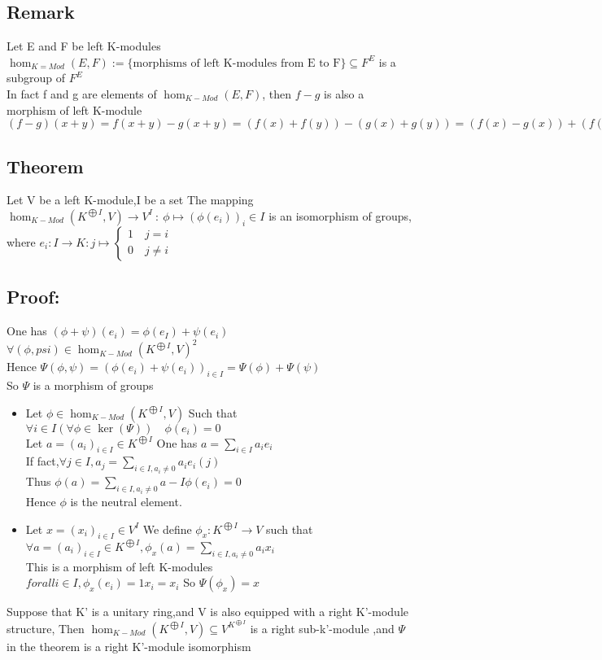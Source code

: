 \documentclass{book}
\begin{document}
\subsection{Remark}

Let E and F be left K-modules\\$\hom_{K=Mod}(E,F):=\{\text{morphisms of left K-modules from E to F}\}\subseteq F^E$ is a subgroup of $F^E$\\
In fact f and g are elements of $\hom_{K-Mod}(E,F)$, then $f-g$ is also a morphism of left K-module\\$(f-g)(x+y)=f(x+y)-g(x+y)=(f(x)+f(y))-(g(x)+g(y))=(f(x)-g(x))+(f(y)-g(y))=(f-g)(x)+(f-y)(x)$
\subsection{Theorem}

Let V be a left K-module,I be a set The mapping $\hom_{K-Mod}(K^{\bigoplus I},V)\rightarrow V^I\ :\ \phi\mapsto(\phi(e_i))_i\in I$ is an isomorphism of groups, where $e_i:I\rightarrow K:j\mapsto\left\{\begin{aligned}
    1\quad j=i\\
    0\quad j\not=i
\end{aligned} \right.$
\subsection{Proof:}
One has $(\phi+\psi)(e_i)=\phi(e_I)+\psi(e_i)$\\
$\forall(\phi,psi)\in \hom_{K-Mod}(K^{\bigoplus I},V)^2$\\
Hence $\Psi(\phi,\psi)=(\phi(e_i)+\psi(e_i))_{i\in I}=\Psi(\phi)+\Psi(\psi)$\\
So $\Psi$ is a morphism of groups
\begin{itemize}
    \item [injectivity] Let $\phi\in \hom_{K-Mod}(K^{\bigoplus I},V)$ Such that $\forall i\in I(\forall \phi\in\ker(\Psi))\quad\phi(e_i)=0$\\Let $a =(a_i)_{i\in I}\in K^{\bigoplus I}$ One has $a=\sum\limits_{i\in I}a_ie_i$ \\ If fact,$\forall j\in I,a_j=\sum\limits_{i\in I,a_i\not=0}a_ie_i(j)$\\Thus $\phi(a)=\sum\limits_{i\in I,a_i\not=0}a-I\phi(e_i)=0$\\Hence $\phi$ is the neutral element.
    \item [surjectivity] Let $x=(x_i)_{i\in I}\in V^I$ We define $\phi_x:K^{\bigoplus I}\rightarrow V$ such that $\forall a=(a_i)_{i\in I}\in K^{\bigoplus I},\phi_x(a)=\sum\limits_{i\in I,a_i\not=0}a_ix_i$\\This is a morphism of left K-modules\\$forall i\in I,\phi_x(e_i)=1x_i=x_i$  So $\Psi(\phi_x)=x$
\end{itemize}
{\color{blue}Suppose that K' is a unitary ring,and V is also equipped with a right K'-module structure, Then $\hom_{K-Mod}(K^{\bigoplus I},V)\subseteq V^{K^{\bigoplus I}}$ is a right sub-k'-module ,and $\Psi$ in the theorem is a right K'-module isomorphism}
\end{document}
